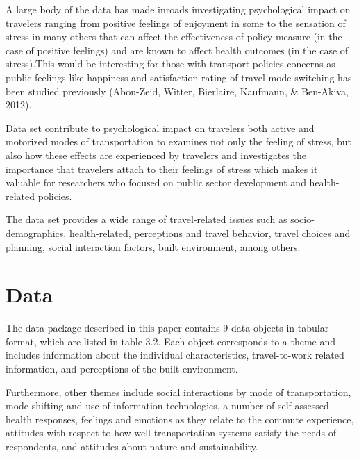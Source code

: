 \documentclass[
11pt, %
oneside, %
english, %
singlespacing, %
]{macthesis} %
\begin{document}
A large body of the data has made inroads investigating psychological impact on travelers ranging from positive feelings of enjoyment in some to the sensation of stress in many others that can affect the effectiveness of policy measure (in the case of positive feelings) and are known to affect health outcomes (in the case of stress).This would be interesting for those with transport policies concerns as public feelings like happiness and satisfaction rating of travel mode switching has been studied previously (Abou-Zeid, Witter, Bierlaire, Kaufmann, \& Ben-Akiva, 2012).

Data set contribute to psychological impact on travelers both active and motorized modes of transportation to examines not only the feeling of stress, but also how these effects are experienced by travelers and investigates the importance that travelers attach to their feelings of stress which makes it valuable for researchers who focused on public sector development and health-related policies.

The data set provides a wide range of travel-related issues such as socio-demographics, health-related, perceptions and travel behavior, travel choices and planning, social interaction factors, built environment, among others.

\hypertarget{data}{%
\section{Data}\label{data}}

The data package described in this paper contains 9 data objects in tabular format, which are listed in table 3.2. Each object corresponds to a theme and includes information about the individual characteristics, travel-to-work related information, and perceptions of the built environment.

Furthermore, other themes include social interactions by mode of transportation, mode shifting and use of information technologies, a number of self-assessed health responses, feelings and emotions as they relate to the commute experience, attitudes with respect to how well transportation systems satisfy the needs of respondents, and attitudes about nature and sustainability.
\end{document}

